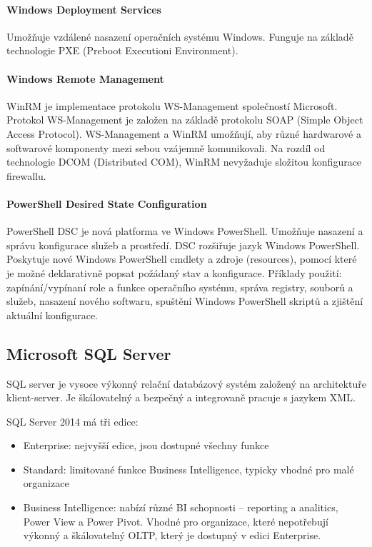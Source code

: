 \paragraph{Windows Deployment Services} 
Umožňuje vzdálené nasazení operačních systému Windows. Funguje na základě technologie PXE (Preboot Executioni Environment). \cite{MasteringWindowsServer}

\paragraph{Windows Remote Management}
WinRM je implementace protokolu WS-Management společností Microsoft. Protokol WS-Management je založen na základě protokolu SOAP (Simple Object Access Protocol). WS-Management a WinRM umožňují, aby různé hardwarové a softwarové komponenty mezi sebou vzájemně komunikovali. Na rozdíl od technologie DCOM (Distributed COM), WinRM nevyžaduje složitou konfigurace firewallu. \cite{MasteringWindowsServer}

\paragraph{PowerShell Desired State Configuration}
PowerShell DSC je nová platforma ve Windows PowerShell. Umožňuje nasazení a správu konfigurace služeb a prostředí. DSC rozšiřuje jazyk Windows PowerShell. Poskytuje nové Windows PowerShell cmdlety a zdroje (resources), pomocí které je možné deklarativně popsat požádaný stav a konfigurace. Příklady použití: zapínání/vypínaní role a funkce operačního systému, správa registry, souborů a služeb, nasazení nového softwaru, spuštění Windows PowerShell skriptů a zjištění aktuální konfigurace. \cite{dsc}

\subsection{Microsoft SQL Server}
SQL server je vysoce výkonný relační databázový systém založený na architektuře klient-server. Je škálovatelný a bezpečný a integrovaně pracuje s jazykem XML. 

SQL Server 2014 má tři edice:
\begin{itemize}
\item Enterprise: nejvyšší edice, jsou dostupné všechny funkce
\item Standard: limitované funkce Business Intelligence, typicky vhodné pro malé organizace
\item Business Intelligence: nabízí různé BI schopnosti -- reporting a analitics, Power View a Power Pivot. Vhodné pro organizace, které nepotřebují výkonný a škálovatelný OLTP, který je dostupný v edici Enterprise.
\end{itemize}

